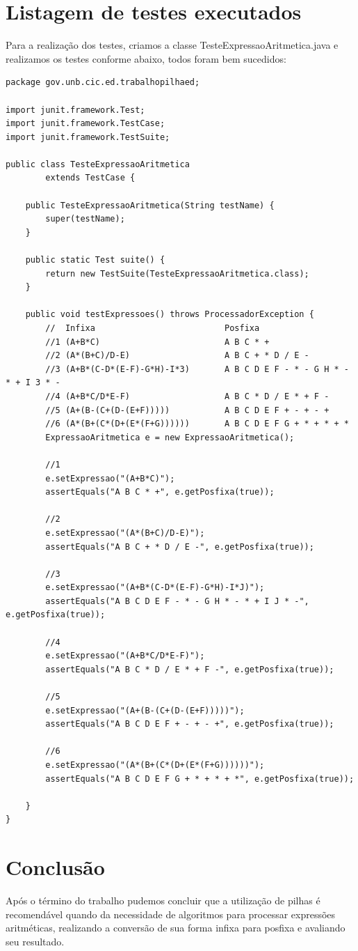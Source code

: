 \documentclass[a4paper,11pt]{article}
\begin{document}
\section{Listagem de testes executados}
Para a realização dos testes, criamos a classe TesteExpressaoAritmetica.java e realizamos os testes conforme abaixo, todos foram bem sucedidos:
\begin{lstlisting}
package gov.unb.cic.ed.trabalhopilhaed;

import junit.framework.Test;
import junit.framework.TestCase;
import junit.framework.TestSuite;

public class TesteExpressaoAritmetica
        extends TestCase {

    public TesteExpressaoAritmetica(String testName) {
        super(testName);
    }

    public static Test suite() {
        return new TestSuite(TesteExpressaoAritmetica.class);
    }

    public void testExpressoes() throws ProcessadorException {
        //  Infixa                          Posfixa
        //1 (A+B*C)                         A B C * +
        //2 (A*(B+C)/D-E)                   A B C + * D / E -
        //3 (A+B*(C-D*(E-F)-G*H)-I*3)       A B C D E F - * - G H * - * + I 3 * -
        //4 (A+B*C/D*E-F)                   A B C * D / E * + F -
        //5 (A+(B-(C+(D-(E+F)))))           A B C D E F + - + - +
        //6 (A*(B+(C*(D+(E*(F+G))))))       A B C D E F G + * + * + *
        ExpressaoAritmetica e = new ExpressaoAritmetica();
        
        //1
        e.setExpressao("(A+B*C)");
        assertEquals("A B C * +", e.getPosfixa(true));
        
        //2
        e.setExpressao("(A*(B+C)/D-E)");
        assertEquals("A B C + * D / E -", e.getPosfixa(true));
        
        //3
        e.setExpressao("(A+B*(C-D*(E-F)-G*H)-I*J)");
        assertEquals("A B C D E F - * - G H * - * + I J * -", e.getPosfixa(true));
        
        //4
        e.setExpressao("(A+B*C/D*E-F)");
        assertEquals("A B C * D / E * + F -", e.getPosfixa(true));
        
        //5
        e.setExpressao("(A+(B-(C+(D-(E+F)))))");
        assertEquals("A B C D E F + - + - +", e.getPosfixa(true));
        
        //6
        e.setExpressao("(A*(B+(C*(D+(E*(F+G))))))");
        assertEquals("A B C D E F G + * + * + *", e.getPosfixa(true));                
        
    }
}

\end{lstlisting}

\section{Conclusão}
Após o término do trabalho pudemos concluir que a utilização de pilhas é recomendável quando da necessidade de algoritmos para processar expressões aritméticas, realizando a conversão de sua forma infixa para posfixa e avaliando seu resultado.
\nocite{*}					%
		
		
\end{document}
